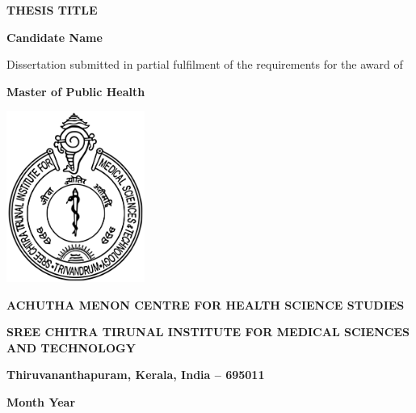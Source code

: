 \begin{titlepage}
    \centering
    \vspace*{0.1cm}

    {\bfseries\fontsize{16}{20}\selectfont
      \MakeUppercase{Thesis Title}\par}

    \vspace{1.0cm}

    {\bfseries\Large Candidate Name\par}

    \vspace{1.0cm}

    {\fontsize{12}{12}\selectfont
      Dissertation submitted in partial fulfilment of the requirements for the award of\par}

    \vspace{0.2cm}

    {\bfseries Master of Public Health\par}

    \vfill                      %

    \includegraphics[width=0.34\textwidth]{sctimst_emblem.png}

    \vfill

    {\bfseries ACHUTHA MENON CENTRE FOR HEALTH SCIENCE STUDIES\par}
    {\bfseries SREE CHITRA TIRUNAL INSTITUTE FOR MEDICAL SCIENCES AND TECHNOLOGY\par}

    \vspace{0.2cm}

    {\bfseries Thiruvananthapuram, Kerala, India – 695011\par}

    \vspace{0.6cm}

    {\bfseries Month Year\par}

\end{titlepage}
\clearpage
{}      %
